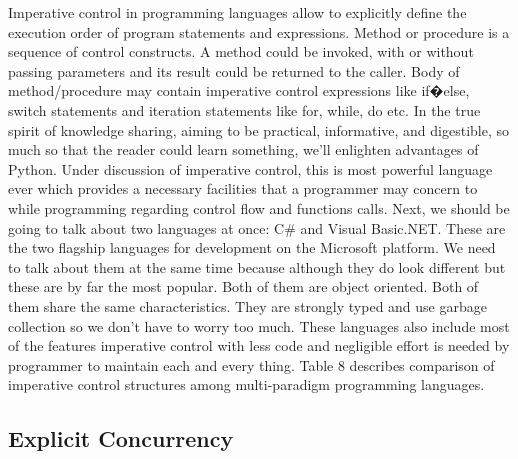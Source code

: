 \documentclass{sig-alternate}
\begin{document}
	Imperative control in programming languages allow to explicitly define the execution order of program statements and expressions. Method or procedure is a sequence of control constructs. A method could be invoked, with or without passing parameters and its result could be returned to the caller. Body of method/procedure may contain imperative control expressions like if�else, switch statements and iteration statements like for, while, do etc.
	\newline
	In the true spirit of knowledge sharing, aiming to be practical, informative, and digestible, so much so that the reader could learn something, we'll enlighten advantages of Python. Under discussion of imperative control, this is most powerful language ever which provides a necessary facilities that a programmer may concern to while programming regarding control flow and functions calls. Next, we should be going to talk about two languages at once: C\# and Visual Basic.NET. These are the two flagship languages for development on the Microsoft platform. We need to talk about them at the same time because although they do look different but these are by far the most popular. Both of them are object oriented. Both of them share the same characteristics. They are strongly typed and use garbage collection so we don't have to worry too much. These languages also include most of the features imperative control with less code and negligible effort is needed by programmer to maintain each and every thing. Table 8 describes comparison of imperative control structures among multi-paradigm programming languages. 
	
	
	\subsection{Explicit Concurrency}
	
\end{document}
